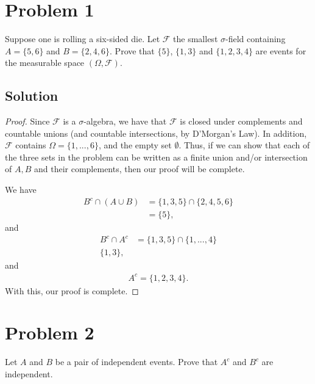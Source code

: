 \documentclass[10pt,a4paper]{article}
\author{Jeremiah Givens}
\theoremstyle{theorem}
\theoremstyle{definition}
\begin{document}
\section*{Problem 1}
Suppose one is rolling a six-sided die. Let $\mathcal{F}$ the smallest $\sigma$-field containing $A = \{5, 6\}$
and $B = \{2, 4, 6\}$.  Prove that $\{5\}$,  $\{1, 3\}$ and $\{1, 2, 3, 4\}$ are events for the measurable space
$(\Omega,\mathcal{F})$.

\subsection*{Solution}

\begin{proof}
Since $\mathcal{F}$ is a $\sigma$-algebra, we have that $\mathcal{F}$ is closed under complements and countable unions (and countable intersections, by D'Morgan's Law). In addition, $\mathcal{F}$ contains $\Omega = \{1, ...,6\}$, and the empty set $\emptyset$. Thus, if we can show that each of the three sets in the problem can be written as a finite union and/or intersection of $A, B$ and their complements, then our proof will be complete.

We have 
\begin{align*}
B^c \cap (A \cup B) &= \{1, 3, 5\} \cap \{2, 4, 5, 6\}\\
&= \{5\},
\end{align*}
and
\begin{align*}
B^c \cap A^c &= \{1, 3, 5\} \cap \{1, ..., 4\}\\
\{1, 3\},
\end{align*}
and
\begin{align*}
A^c = \{1, 2, 3, 4\}.
\end{align*}
With this, our proof is complete.
\end{proof}

\section*{Problem 2}
Let $A$ and $B$ be a pair of independent events. Prove that $A^c$ and $B^c$ are independent.
\end{document}
